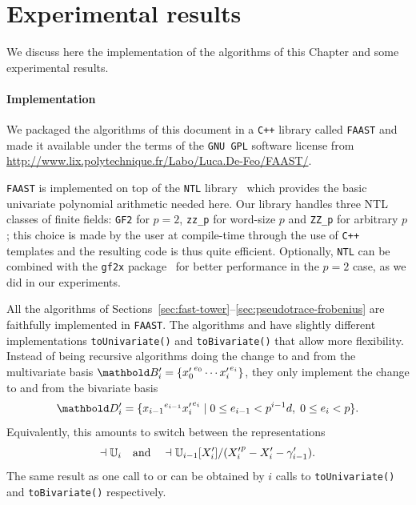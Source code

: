 

\section{Experimental results}
\label{sec:artin-benchmarks}

We discuss here the implementation of the algorithms of this Chapter
and some experimental results.

\paragraph{Implementation}
We packaged the algorithms of this document in a \texttt{C++} library
called \texttt{FAAST} and made it available under the terms of the
\texttt{GNU GPL} software license from
\url{http://www.lix.polytechnique.fr/Labo/Luca.De-Feo/FAAST/}.

\texttt{FAAST} is implemented on top of the \texttt{NTL}
library~\cite{shoup2003ntl} which provides the basic univariate
polynomial arithmetic needed here. Our library handles three NTL
classes of finite fields: \texttt{GF2} for $p=2$, \texttt{zz\_p} for
word-size $p$ and \texttt{ZZ\_p} for arbitrary $p$; this choice is made
by the user at compile-time through the use of \texttt{C++} templates
and the resulting code is thus quite efficient.  Optionally,
\texttt{NTL} can be combined with the \texttt{gf2x}
package~\cite{gf2x} for better performance in the $p=2$ case, as we
did in our experiments.

All the algorithms of
Sections~\ref{sec:fast-tower}--\ref{sec:pseudotrace-frobenius} are
faithfully implemented in \texttt{FAAST}. The algorithms
 and  have
slightly different implementations \texttt{toUnivariate()} and
\texttt{toBivariate()} that allow more flexibility. Instead of being
recursive algorithms doing the change to and from the multivariate
basis $\basis{B}'_i=\{{x_0'}^{e_0}\cdots {x_i'}^{e_i}\}$, they only
implement the change to and from the bivariate basis
\begin{equation}
  \label{eq:278}
  \basis{D}'_i=\{{x_{i-1}}^{e_{i-1}}{x_i'}^{e_i} \;|\;0\le
  e_{i-1}<p^{i-1}d,\; 0\le e_i<p\}
  \text{.}
\end{equation}
Equivalently, this amounts to
switch between the representations
\begin{equation}
  \dashv\mathbb{U}_i \quad\text{and}\quad
  \dashv\mathbb{U}_{i-1}[X_i']/({X_i'}^p-X_i'-\gamma_{i-1}')
  \text{.}
\end{equation}
The same result as one call to  or
 can be obtained by $i$ calls to
\texttt{toUnivariate()} and \texttt{toBivariate()} respectively.

